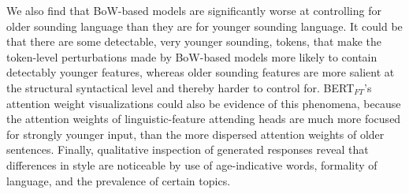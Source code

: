 We also find that BoW-based models are significantly worse at controlling for older sounding language than they are for younger sounding language. It could be that there are some detectable, very younger sounding, tokens, that make the token-level perturbations made by BoW-based models more likely to contain detectably younger features, whereas older sounding features are more salient at the structural syntactical level and thereby harder to control for. BERT$_{FT}$'s attention weight visualizations could also be evidence of this phenomena, because the attention weights of linguistic-feature attending heads are much more focused for strongly younger input, than the more dispersed attention weights of older sentences. Finally, qualitative inspection of generated responses reveal that differences in style are noticeable by use of age-indicative words, formality of language, and the prevalence of certain topics.

